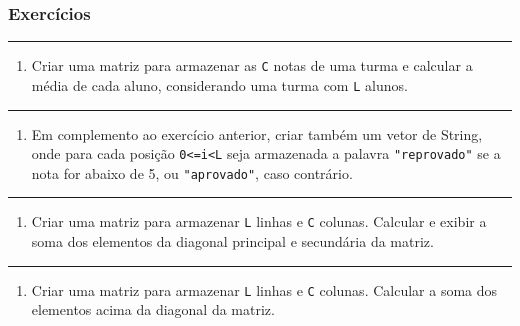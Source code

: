 \documentclass[12pt,a4paper]{article}
\renewcommand{\linethickness}{0.05em}
\providecommand{\tightlist}{%
      \setlength{\itemsep}{0pt}\setlength{\parskip}{0pt}}
\begin{document}
    \hypertarget{exercuxedcios}{%
\subsubsection{Exercícios}\label{exercuxedcios}}

    \begin{center}\rule{0.5\linewidth}{\linethickness}\end{center}

\begin{enumerate}
\def\labelenumi{\arabic{enumi}.}
\tightlist
\item
  Criar uma matriz para armazenar as \texttt{C} notas de uma turma e
  calcular a média de cada aluno, considerando uma turma com \texttt{L}
  alunos.
\end{enumerate}

    \begin{center}\rule{0.5\linewidth}{\linethickness}\end{center}

\begin{enumerate}
\def\labelenumi{\arabic{enumi}.}
\setcounter{enumi}{1}
\tightlist
\item
  Em complemento ao exercício anterior, criar também um vetor de String,
  onde para cada posição \texttt{0\textless{}=i\textless{}L} seja
  armazenada a palavra \texttt{"reprovado"} se a nota for abaixo de 5,
  ou \texttt{"aprovado"}, caso contrário.
\end{enumerate}

    \begin{center}\rule{0.5\linewidth}{\linethickness}\end{center}

\begin{enumerate}
\def\labelenumi{\arabic{enumi}.}
\setcounter{enumi}{2}
\tightlist
\item
  Criar uma matriz para armazenar \texttt{L} linhas e \texttt{C}
  colunas. Calcular e exibir a soma dos elementos da diagonal principal
  e secundária da matriz.
\end{enumerate}

    \begin{center}\rule{0.5\linewidth}{\linethickness}\end{center}

\begin{enumerate}
\def\labelenumi{\arabic{enumi}.}
\setcounter{enumi}{3}
\tightlist
\item
  Criar uma matriz para armazenar \texttt{L} linhas e \texttt{C}
  colunas. Calcular a soma dos elementos acima da diagonal da matriz.
\end{enumerate}
\end{document}
